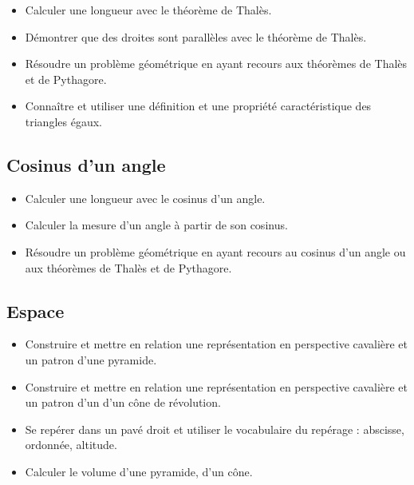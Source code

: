 \documentclass[a4paper,12pt,fleqn]{article}	
\begin{document}
\begin{itemize}
	\item {}Calculer une longueur avec le théorème de Thalès.
	\item {}Démontrer que des droites sont parallèles avec le théorème de Thalès.
	\item {}Résoudre un problème géométrique en ayant recours aux théorèmes de Thalès et de Pythagore.
	\item {}Connaître et utiliser une définition et une propriété caractéristique des triangles égaux.
\end{itemize}

\subsection*{Cosinus d'un angle}

\begin{itemize}
	\item {}Calculer une longueur avec le cosinus d'un angle.
	\item {}Calculer la mesure d’un angle à partir de son cosinus.
	\item {}Résoudre un problème géométrique en ayant recours au cosinus d'un angle ou aux théorèmes de Thalès et de Pythagore.
\end{itemize}

\subsection*{Espace}

\begin{itemize}
	\item {}Construire et mettre en relation une représentation en perspective cavalière et un patron d’une pyramide.
	\item {}Construire et mettre en relation une représentation en perspective cavalière et un patron d’un d’un cône de révolution.
	\item {}Se repérer dans un pavé droit et utiliser le vocabulaire du repérage : abscisse, ordonnée, altitude.
	\item {}Calculer le volume d’une pyramide, d’un cône.
\end{itemize}
	
\end{document}
